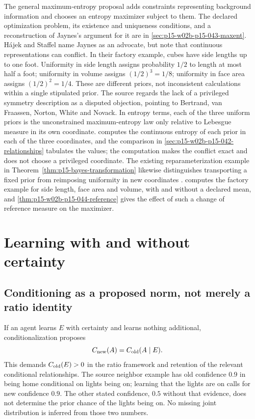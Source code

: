 The general maximum-entropy proposal adds constraints representing
background information and chooses an entropy maximizer subject to
them. The declared optimization problem, its existence and uniqueness
conditions, and a reconstruction of Jaynes's argument for it are in
\cref{sec:p15-w02b-p15-043-maxent}. H\'ajek and Staffel name Jaynes as
an advocate, but note that continuous representations can conflict. In their factory example,
cubes have side lengths up to one foot. Uniformity in side length
assigns probability \(1/2\) to length at most half a foot; uniformity
in volume assigns \((1/2)^3=1/8\); uniformity in face area assigns
\((1/2)^2=1/4\). These are different priors, not inconsistent calculations
within a single stipulated prior. The source regards the lack of a
privileged symmetry description as a disputed objection, pointing to
Bertrand, van Fraassen, Norton, White and Novack.
In entropy terms, each of the three uniform priors is the unconstrained
maximum-entropy law only relative to Lebesgue measure in its own
coordinate.  computes the
continuous entropy of each prior in each of the three coordinates, and the
comparison in \cref{sec:p15-w02b-p15-042-relationships} tabulates the
values; the computation makes the conflict exact and does not choose a
privileged coordinate.
The existing reparameterization example in
Theorem~\ref{thm:p15-bayes-transformation} likewise distinguishes
transporting a fixed prior from reimposing uniformity in new coordinates
\parencite[pp.~243--244]{HajekStaffel2021Dynamics}.
computes the factory example for side length, face area and volume, with
and without a declared mean, and \cref{thm:p15-w02b-p15-044-reference}
gives the effect of such a change of reference measure on the maximizer.

\section{Learning with and without certainty}
\label{sec:p15-rat41-dynamics}

\subsection{Conditioning as a proposed norm, not merely a ratio identity}

If an agent learns \(E\) with certainty and learns nothing additional,
conditionalization proposes
\[
                     C_{\rm new}(A)=C_{\rm old}(A\mid E).
\]
This demands \(C_{\rm old}(E)>0\) in the ratio framework and retention
of the relevant conditional relationships. The source neighbor example
has old confidence \(0.9\) in being home conditional on lights being on;
learning that the lights are on calls for new confidence \(0.9\).
The other stated confidence, \(0.5\) without that evidence, does not
determine the prior chance of the lights being on. No missing joint
distribution is inferred from those two numbers.

